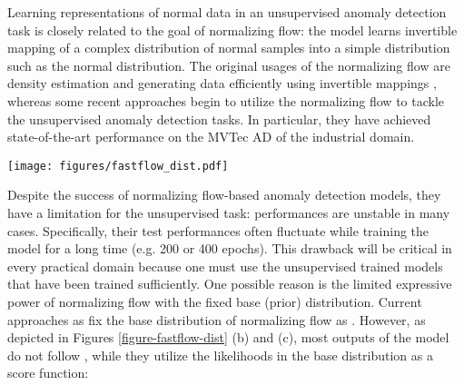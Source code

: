 \documentclass[letterpaper]{article}
\begin{document}
Learning representations of normal data in an unsupervised anomaly detection task is closely related to the goal of normalizing flow: the model learns invertible mapping of a complex distribution of normal samples into a simple distribution such as the normal distribution. The original usages of the normalizing flow are density estimation and generating data efficiently using invertible mappings \cite{dinh1, kingma1}, whereas some recent approaches \cite{rudolph1, yu1, gudovskiy1} begin to utilize the normalizing flow to tackle the unsupervised anomaly detection tasks. In particular, they have achieved state-of-the-art performance on the MVTec AD \cite{bergmann1} of the industrial domain.

\begin{figure*}[tb]
\begin{center}
    \texttt{[image: figures/fastflow\_dist.pdf]}
\caption{Histograms of outputs of FastFlow. This figure shows that outputs of normalizing flow follow an arbitrary normal distribution, not the base distribution .
Feature extractor: CaiT, input: MVTec AD capsule category.
(a) The result of the Shapiro-Wilk test \cite{shapiro} applied to values of each spatial location of each channel among outputs from normal images. The distribution with a p-value  is usually considered normal.
(b) The result of the Kolmogorov-Smirnov test (KS-test) \cite{kstest} applied to the same ones with (a). p-value  implies the distribution is highly likely to be .
(c) Visualization of one of the distributions. Ideally, it should follow . However its distribution is roughly .}
\label{figure-fastflow-dist}
\end{center}
\end{figure*}

Despite the success of normalizing flow-based anomaly detection models, they have a limitation for the unsupervised task: performances are unstable in many cases. Specifically, their test performances often fluctuate while training the model for a long time (e.g. 200 or 400 epochs). This drawback will be critical in every practical domain because one must use the unsupervised trained models that have been trained sufficiently. One possible reason is the limited expressive power of normalizing flow with the fixed base (prior) distribution. Current approaches as \citet{rudolph1, yu1, gudovskiy1} fix the base distribution of normalizing flow as . However, as depicted in Figures \ref{figure-fastflow-dist} (b) and (c), most outputs of the model do not follow , while they utilize the likelihoods in the base distribution as a score function: 
\end{document}
